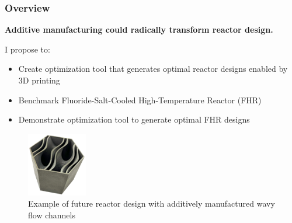 \begin{frame}
    \frametitle{Overview}
    \textbf{Additive manufacturing could radically transform reactor design.}
    \vspace{0.5cm}

    I propose to: 
    \begin{itemize}
        \item Create optimization tool that generates optimal 
        reactor designs enabled by 3D printing 
        \item Benchmark Fluoride-Salt-Cooled High-Temperature Reactor (FHR)
        \item Demonstrate optimization tool to generate optimal FHR designs
    \end{itemize}
    \begin{figure}[]
        \includegraphics[width=0.2\linewidth]{figures/wavy-channels.png}
        \caption{Example of future reactor design with additively manufactured wavy 
        flow channels}
    \end{figure}
\end{frame}